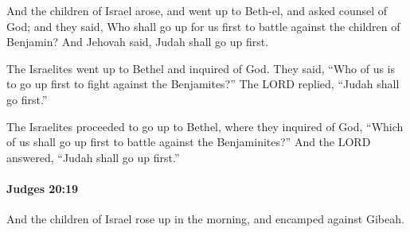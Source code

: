 			\begin{versebox}
					\item[BHS] 
					\item[ASV] And the children of Israel arose, and went up to Beth-el, and asked counsel of God; and they said, Who shall go up for us first to battle against the children of Benjamin? And Jehovah said, Judah shall go up first.
					\item[NIV] The Israelites went up to Bethel and inquired of God. They said, “Who of us is to go up first to fight against the Benjamites?” The LORD replied, “Judah shall go first.”
					\item[NRSV] The Israelites proceeded to go up to Bethel, where they inquired of God, “Which of us shall go up first to battle against the Benjaminites?” And the LORD answered, “Judah shall go up first.”
			\end{versebox}

		\paragraph{Judges 20:19} %
			\label{JUDGES-20-19}

			And the children of Israel rose up in the morning, and encamped against Gibeah.

